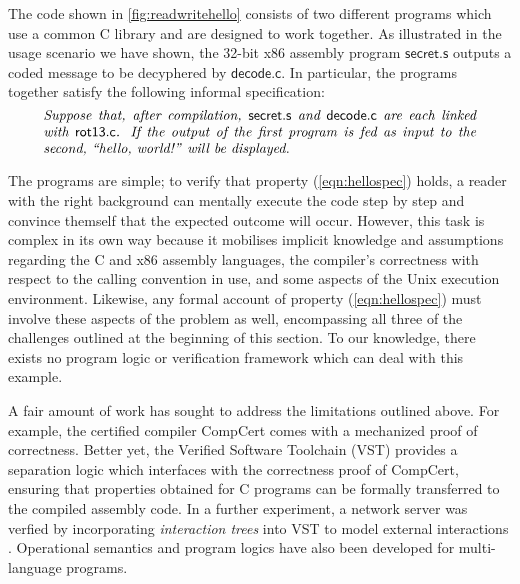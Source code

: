 \documentclass[acmsmall,screen,review,nonacm]{acmart}
\newcommand{\kw}[1]{\ensuremath{ \mathsf{#1} }}
\begin{document}
\begin{example} \label{ex:readwritehello} %
The code shown in \autoref{fig:readwritehello}
consists of two different programs which
use a common C library and
are designed to work together.
As illustrated in the usage scenario we have shown,
the 32-bit x86 assembly program \kw{secret.s} 
outputs a coded message
to be decyphered by \kw{decode.c}.
In particular,
the programs together satisfy the following informal specification:
\begin{equation}
  \begin{minipage}{.9\textwidth}
  \it
  Suppose that,
  after compilation,
  \kw{secret.s} and \kw{decode.c}
  are each linked with \kw{rot13.c}.
  If the output of the first program
  is fed as input to the second,
  ``hello, world!'' will be displayed.
  \end{minipage}
  \label{eqn:hellospec}
\end{equation}

The programs are simple;
to verify that property (\ref{eqn:hellospec}) holds,
a reader with the right background
can mentally execute the code step by step
and convince themself that the expected outcome will occur.
However, this task is complex in its own way
because it mobilises implicit knowledge and assumptions regarding
the C and x86 assembly languages,
the compiler's correctness with respect to the calling convention in use,
and some aspects of the Unix execution environment.
%
Likewise, any formal account of property (\ref{eqn:hellospec})
must involve these aspects of the problem as well,
encompassing all three of the challenges outlined at the beginning of this section.
To our knowledge,
there exists no program logic or verification framework
which can deal with this example.
\end{example}

A fair amount of work has sought to address
the limitations outlined above.
For example,
the certified compiler CompCert \citep{compcert}
comes with a mechanized proof of correctness.
Better yet,
the Verified Software Toolchain (VST) \citep{vst}
provides a separation logic which interfaces with
the correctness proof of CompCert,
ensuring that properties obtained for C programs
can be formally transferred to the compiled assembly code.
In a further experiment,
a network server was verfied
by incorporating \emph{interaction trees} into VST
to model external interactions \cite{itrees}.
Operational semantics \cite{opsem-multi} and
program logics \cite{melocoton}
have also been developed for multi-language programs.
\end{document}
